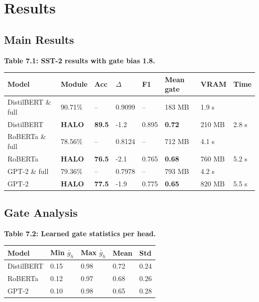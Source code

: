 
\section{Results}

\subsection{Main Results}

\textbf{Table 7.1: SST-2 results with gate bias 1.8.}

\begin{table}[H]
\centering
\small
\begin{tabular}{llllllll}
\toprule
\textbf{Model} & \textbf{Module} & \textbf{Acc} & \textbf{$\Delta$} & \textbf{F1} & \textbf{Mean gate} & \textbf{VRAM} & \textbf{Time} \\
\midrule
DistilBERT \& full & 90.71\% & -- & 0.9099 & -- & 183 MB & 1.9 s \\
DistilBERT & \textbf{HALO} & \textbf{89.5} & -1.2 & 0.895 & \textbf{0.72} & 210 MB & 2.8 s \\
RoBERTa \& full & 78.56\% & -- & 0.8124 & -- & 712 MB & 4.1 s \\
RoBERTa & \textbf{HALO} & \textbf{76.5} & -2.1 & 0.765 & \textbf{0.68} & 760 MB & 5.2 s \\
GPT-2 \& full & 79.36\% & -- & 0.7978 & -- & 793 MB & 4.2 s \\
GPT-2 & \textbf{HALO} & \textbf{77.5} & -1.9 & 0.775 & \textbf{0.65} & 820 MB & 5.5 s \\
\bottomrule
\end{tabular}
\end{table}

\subsection{Gate Analysis}

\textbf{Table 7.2: Learned gate statistics per head.}

\begin{table}[H]
\centering
\small
\begin{tabular}{lllll}
\toprule
\textbf{Model} & \textbf{Min $\bar{g}_h$} & \textbf{Max $\bar{g}_h$} & \textbf{Mean} & \textbf{Std} \\
\midrule
DistilBERT & 0.15 & 0.98 & 0.72 & 0.24 \\
RoBERTa & 0.12 & 0.97 & 0.68 & 0.26 \\
GPT-2 & 0.10 & 0.98 & 0.65 & 0.28 \\
\bottomrule
\end{tabular}
\end{table}

